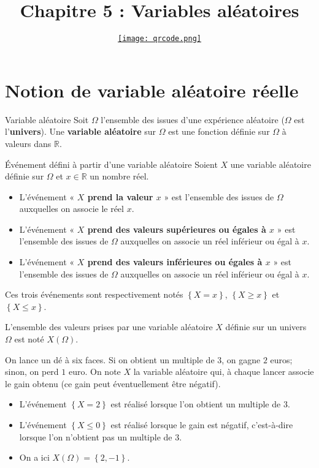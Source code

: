 \documentclass[11pt]{article}
\title{\vspace{-10mm}Chapitre 5 : Variables aléatoires}
\date{\vspace{-14mm}
\href{https://erou.forge.aeif.fr/s11/variables-aleatoires.html}{
  \texttt{[image: qrcode.png]}}
\vspace{-12mm}}
\author{}
\begin{document}
\maketitle\thispagestyle{fancy}

\section{Notion de variable aléatoire réelle}

\begin{defi}{Variable aléatoire}
  Soit $\Omega$ l'ensemble des issues d'une expérience aléatoire ($\Omega$ est
  l'\textbf{univers}). Une \textbf{variable aléatoire} sur $\Omega$ est une
  fonction définie sur $\Omega$ à valeurs dans $\mathbb{R}$.
\end{defi}

\begin{defi}{Événement défini à partir d'une variable aléatoire}
  Soient $X$ une variable aléatoire définie sur $\Omega$ et $x\in\mathbb{R}$ un
  nombre réel.
  \begin{itemize}
    \item L'événement « \textbf{$X$ prend la valeur $x$} » est l'ensemble des
      issues de $\Omega$ auxquelles on associe le réel $x$.
    \item L'événement « \textbf{$X$ prend des valeurs supérieures ou égales
      à $x$} » est l'ensemble des
      issues de $\Omega$ auxquelles on associe un réel inférieur ou égal à $x$.
    \item L'événement « \textbf{$X$ prend des valeurs inférieures ou égales
      à $x$} » est l'ensemble des
      issues de $\Omega$ auxquelles on associe un réel inférieur ou égal à $x$.
  \end{itemize}
\end{defi}
\begin{notation}
  Ces trois événements sont respectivement notés $\left\{ X=x \right\}$,
  $\left\{ X\geq x \right\}$ et $\left\{ X\leq x \right\}$.
\end{notation}

\begin{notation}
  L'ensemble des valeurs prises par une variable aléatoire $X$ définie sur un
  univers $\Omega$ est noté $X(\Omega)$.
\end{notation}

\begin{exemple}
  On lance un dé à six faces. Si on obtient un multiple de $3$, on gagne $2$
  euros; sinon, on perd $1$ euro. On note $X$ la variable aléatoire qui, à
  chaque lancer associe le gain obtenu (ce gain peut éventuellement être
  négatif).
  \begin{itemize}
    \item L'événement $\left\{ X=2 \right\}$ est réalisé lorsque l'on obtient un
      multiple de $3$.
    \item L'événement $\left\{ X\leq0 \right\}$ est réalisé lorsque le gain est
      négatif, c'est-à-dire lorsque l'on n'obtient pas un multiple de $3$.
    \item On a ici $X\left( \Omega \right)=\left\{ 2, -1 \right\}$.
  \end{itemize}
\end{exemple}
\end{document}
